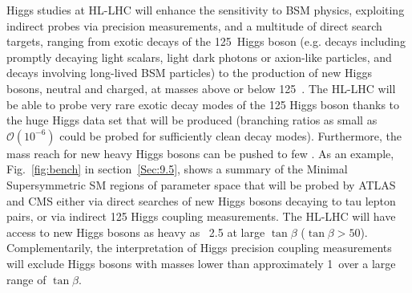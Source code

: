 \documentclass[../report.tex]{subfiles}
\begin{document}
Higgs studies at HL-LHC will enhance the sensitivity to BSM physics, exploiting indirect probes via precision measurements, and a multitude of direct search targets, ranging from exotic decays of the 125~\UGeV Higgs boson (e.g. decays including promptly decaying light scalars, light dark photons or axion-like particles, and decays involving long-lived BSM particles) to the production of new Higgs bosons, neutral and charged, at masses above or below 125~\UGeV.
The HL-LHC will be able to probe very rare exotic decay modes of the 125 \UGeV Higgs boson thanks to the huge Higgs data set that will be produced (branching ratios as small as $\mathcal O(10^{-6})$ could be probed for sufficiently clean decay modes). Furthermore, the mass reach for new heavy Higgs bosons can be pushed to few \UTeV. As an example, Fig.~\ref{fig:bench} in section~\ref{Sec:9.5}, shows a summary of the Minimal Supersymmetric SM regions of parameter space that will be probed by ATLAS and CMS either via direct searches of new Higgs bosons decaying to tau lepton pairs, or via indirect 125 \UGeV Higgs coupling measurements. The HL-LHC will have access to new Higgs bosons as heavy as ~2.5 \UTeV at large $\tan\beta$ ($\tan\beta>50$). Complementarily, the interpretation of Higgs precision coupling measurements will exclude Higgs bosons with masses lower than approximately 1~\UTeV over a large range of $\tan\beta$.
\end{document}

